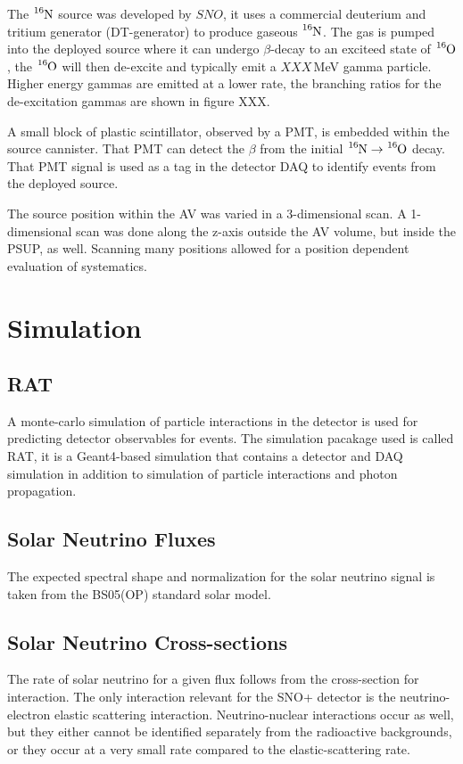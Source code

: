 The $\ce{^{16}N}$ source was developed by $SNO$, it uses a commercial
deuterium and tritium generator (DT-generator) to produce gaseous $\ce{^{16}N}$.
The gas is pumped into the deployed source where it can undergo $\beta$-decay
to an exciteed state of $\ce{^{16}O}$, the $\ce{^{16}O}$ will then de-excite
and typically emit a $XXX$\,MeV gamma particle. Higher energy gammas are emitted
at a lower rate, the branching ratios for the de-excitation gammas are shown in
figure XXX.

A small block of plastic scintillator, observed by a PMT, is embedded within the
source cannister. That PMT can detect the $\beta$ from the initial
$\ce{^{16}N} \rightarrow \ce{^{16}O}$ decay. That PMT signal is used as a
tag in the detector DAQ to identify events from the deployed source.

The source position within the AV was varied in a 3-dimensional
scan.
A 1-dimensional scan was done along the z-axis outside the AV volume,
but inside the PSUP, as well.
Scanning many positions allowed for a position dependent evaluation of
systematics.

\section{Simulation}
\subsection{RAT}
A monte-carlo simulation of particle interactions in the detector is used
for predicting detector observables for events.
The simulation pacakage used is called RAT, it is a Geant4-based simulation that
contains a detector and DAQ simulation in addition to simulation of particle
interactions and photon propagation.

\subsection{Solar Neutrino Fluxes}
The expected spectral shape and normalization for the solar neutrino signal is
taken from the BS05(OP) standard solar model.

\subsection{Solar Neutrino Cross-sections}
The rate of solar neutrino for a given flux follows from the cross-section for
interaction. The only interaction relevant for the SNO+ detector is the
neutrino-electron elastic scattering interaction.
Neutrino-nuclear interactions occur as well, but they either cannot be identified
separately from the radioactive backgrounds, or they occur at a very small rate
compared to the elastic-scattering rate.


